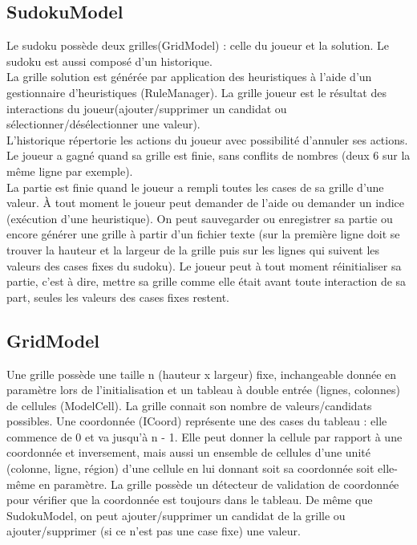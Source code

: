 \subsection{SudokuModel}
Le sudoku possède deux grilles(GridModel) : celle du joueur et la solution. 
Le sudoku est aussi composé d'un historique.\\
La grille solution est générée par application des heuristiques à l’aide 
d’un gestionnaire d’heuristiques (RuleManager). La grille
joueur est le résultat des interactions du joueur(ajouter/supprimer un candidat 
ou sélectionner/désélectionner une valeur). \\
L’historique répertorie les actions du joueur avec possibilité d’annuler ses actions.\\ 
Le joueur a gagné quand sa grille est finie, sans conflits de nombres 
(deux 6 sur la même ligne par exemple).\\
La partie est finie quand le joueur a rempli toutes les cases de sa grille d’une valeur. 
À tout moment le joueur peut demander de l’aide ou demander un indice (exécution d’une
heuristique). On peut sauvegarder ou enregistrer sa partie ou encore générer une grille
à partir d’un fichier texte (sur la première ligne doit se trouver la hauteur
et la largeur de la grille puis sur les lignes qui suivent les valeurs des cases
fixes du sudoku). Le joueur peut à tout moment réinitialiser sa partie, c’est
à dire, mettre sa grille comme elle était avant toute interaction de sa part,
seules les valeurs des cases fixes restent.

\subsection{GridModel}
Une grille possède une taille n (hauteur x largeur) fixe, inchangeable donnée en paramètre lors de l'initialisation et
un tableau à double entrée (lignes, colonnes) de cellules (ModelCell).
La grille connait son nombre de valeurs/candidats possibles.
Une coordonnée (ICoord) représente une des cases du tableau : elle commence de 0 et va jusqu'à n - 1.
Elle peut donner la cellule par rapport à une coordonnée et inversement, mais aussi un ensemble de cellules d'une
unité (colonne, ligne, région) d'une cellule en lui donnant soit sa coordonnée soit elle-même en paramètre.
La grille possède un détecteur de validation de coordonnée pour vérifier que la coordonnée est toujours dans le tableau. 
De même que SudokuModel, on peut ajouter/supprimer un candidat de la grille ou ajouter/supprimer (si ce n'est pas une 
case fixe) une valeur.

